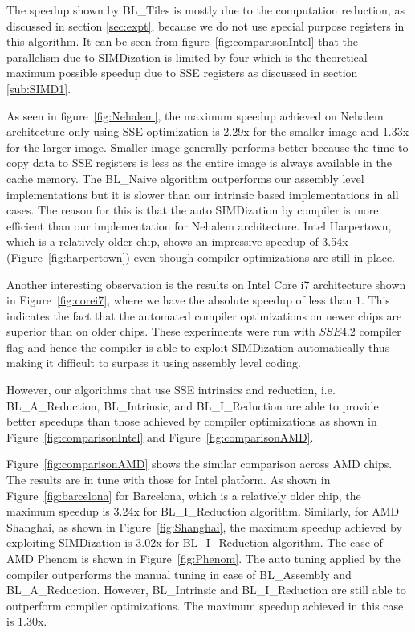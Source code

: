 \documentclass{IEEEtran}
\begin{document}
The speedup shown by BL\_Tiles is mostly due to the computation reduction, as discussed in section \ref{sec:expt}, because we do not use special purpose registers in this algorithm. It can be seen from figure~\ref{fig:comparisonIntel} that the parallelism due to SIMDization is limited by four which is the theoretical maximum possible speedup due to SSE registers as discussed in section \ref{sub:SIMD1}.

As seen in figure~\ref{fig:Nehalem}, the maximum speedup achieved on Nehalem architecture only using SSE optimization is 2.29x for the smaller image and 1.33x for the larger image. Smaller image generally performs better because the time to copy data to SSE registers is less as the entire image is always available in the cache memory. The BL\_Naive algorithm outperforms our assembly level implementations but it is slower than our intrinsic based implementations in all cases. The reason for this is that the auto SIMDization by compiler is more efficient than our implementation for Nehalem architecture. Intel Harpertown, which is a relatively older chip, shows an impressive speedup of 3.54x (Figure~\ref{fig:harpertown}) even though compiler optimizations are still in place. 

Another interesting observation is the results on Intel Core i7 architecture shown in Figure~\ref{fig:corei7}, where we have the absolute speedup of less than $1$. This indicates the fact that the automated compiler optimizations on newer chips are superior than on older chips. These experiments were run with $SSE4.2$ compiler flag and hence the compiler is able to exploit SIMDization automatically thus making it difficult to surpass it using assembly level coding. 

However, our algorithms that use SSE intrinsics and reduction, i.e. BL\_A\_Reduction, BL\_Intrinsic, and BL\_I\_Reduction are able to provide better speedups than those achieved by compiler optimizations as shown in Figure~\ref{fig:comparisonIntel} and Figure~\ref{fig:comparisonAMD}.

Figure~\ref{fig:comparisonAMD} shows the similar comparison across AMD chips. The results are in tune with those for Intel platform. As shown in Figure~\ref{fig:barcelona} for Barcelona, which is a relatively older chip, the maximum speedup is 3.24x for BL\_I\_Reduction algorithm. Similarly, for AMD Shanghai, as shown in Figure~\ref{fig:Shanghai}, the maximum speedup achieved by exploiting SIMDization is 3.02x for BL\_I\_Reduction algorithm. The case of AMD Phenom is shown in Figure~\ref{fig:Phenom}. The auto tuning applied by the compiler outperforms the manual tuning in case of BL\_Assembly and BL\_A\_Reduction. However, BL\_Intrinsic and BL\_I\_Reduction are still able to outperform compiler optimizations. The maximum speedup achieved in this case is 1.30x.
\end{document}
